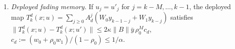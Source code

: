 \begin{lemma}[Lemma D]
\begin{enumerate}[label=(\alph*)]
\[\]
So $\kappa\ell_\Phi\beta<\alpha$ suffices; it tends to $\kappa\ell_\Phi<\alpha$
(Corollary~\ref{cor:m1-amplitude}) as $dt\to0$ with $-\ln\rho/dt\to\alpha-\kappa\ell_\Phi$, and $\beta\le1.1$
under $\|A\|dt\le0.1$ (\texttt{design.choose\_dt}). If the stationary latent $\zeta_k=\hat T_0(x(t_k))$ satisfies
$\zeta_{k+1}=(\text{clean step at }\zeta_k)+\int_0^{dt}e^{A(dt-s)}R\,ds+q_k$, with $\|R\|\le\varepsilon_{\rm res}$
the PDE residual and $q_k$ the interpolation/quadrature defect with $\|A_d^mq_k\|\le\kappa\rho_0^m\bar q$, and the
step is fed samples with $\|v_k\|\le\delta_y$, then
\[
\|\hat z_k-\zeta_k\|\le\kappa\rho^k\|\hat z_0-\zeta_0\|+\frac{\kappa\big(\|B\|(1+\ell_\Phi\tfrac{dt}2)\delta_y+\varepsilon_{\rm res}\big)}{\alpha-\kappa\ell_\Phi\beta}+\frac{\kappa\,\alpha\,\bar q}{(1-\rho_0)(\alpha-\kappa\ell_\Phi\beta)},
\]
a single factor $\kappa$, with $\bar q=O(dt^3)$ so the last term is $O(dt^2)$.
\item \emph{Deployed fading memory.} If $u_j=u'_j$ for $j=k-M,\dots,k-1$, the deployed map
$T^d_k(x;u)=\sum_{j\ge0}A_d^j(W_0y_{k-1-j}+W_1y_{k-j})$ satisfies
$\|T^d_k(x;u)-T^d_k(x;u')\|\le2\kappa\|B\|\bar y\,\rho_0^Mc_d$, $c_d:=(w_0+\rho_0w_1)/(1-\rho_0)\le1/\alpha$.
\end{enumerate}
\end{lemma}

